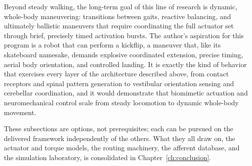 Beyond steady walking, the long-term goal of this line of research is dynamic, whole-body maneuvering: transitions between gaits, reactive balancing, and ultimately ballistic maneuvers that require coordinating the full actuator set through brief, precisely timed activation bursts. The author's aspiration for this program is a robot that can perform a kickflip, a maneuver that, like its skateboard namesake, demands explosive coordinated extension, precise timing, aerial body orientation, and controlled landing. It is exactly the kind of behavior that exercises every layer of the architecture described above, from contact receptors and spinal pattern generation to vestibular orientation sensing and cerebellar coordination, and it would demonstrate that biomimetic actuation and neuromechanical control scale from steady locomotion to dynamic whole-body movement.

These subsections are options, not prerequisites; each can be pursued on the delivered framework independently of the others. What they all draw on, the actuator and torque models, the routing machinery, the afferent database, and the simulation laboratory, is consolidated in Chapter~\ref{ch:conclusion}.
